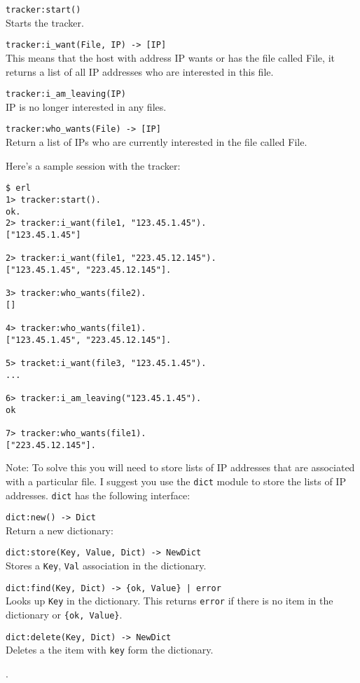 \documentclass[12pt]{hitec}
\begin{document}
\begin{description}


\item \verb+tracker:start()+\\
Starts the tracker.

\item \verb+tracker:i_want(File, IP) -> [IP]+\\
This means that the host with address IP  wants or has the file called File,
it returns a list of all IP addresses who are interested in this file.

\item \verb+tracker:i_am_leaving(IP)+\\
IP is no longer interested in any files.

\item \verb+tracker:who_wants(File) -> [IP]+\\
Return a list of IPs who are currently interested in the file called File.

\end{description}

Here's a sample session with the tracker:

\begin{Verbatim}
$ erl
1> tracker:start().
ok.
2> tracker:i_want(file1, "123.45.1.45").
["123.45.1.45"]
 
2> tracker:i_want(file1, "223.45.12.145").
["123.45.1.45", "223.45.12.145"].

3> tracker:who_wants(file2).
[]

4> tracker:who_wants(file1).
["123.45.1.45", "223.45.12.145"].
 
5> tracket:i_want(file3, "123.45.1.45").
...

6> tracker:i_am_leaving("123.45.1.45").
ok

7> tracker:who_wants(file1).
["223.45.12.145"].
 \end{Verbatim}

Note: To solve this you will need to store lists of IP addresses
that are associated with a particular file. I suggest you use the 
\verb+dict+ module to store the lists of
IP addresses. \verb+dict+ has the following interface:

\begin{description}
\item \verb+dict:new() -> Dict+\\
Return a new dictionary:
\item \verb+dict:store(Key, Value, Dict) -> NewDict+\\
Stores a \verb+Key+, \verb+Val+ association in the dictionary.
\item \verb+dict:find(Key, Dict) -> {ok, Value} | error+\\
Looks up \verb+Key+ in the dictionary. This returns \verb+error+
if there is no item in the dictionary or \verb+{ok, Value}+.
\item \verb+dict:delete(Key, Dict) -> NewDict+\\
Deletes a the item with \verb+key+ form the dictionary.
\end{description}.
\end{document}
